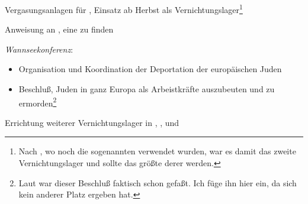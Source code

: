 \begin{chronik}
\item[Juni 1941]
Vergasungsanlagen für , Einsatz ab Herbst als
Vernichtungslager\footnote{Nach , wo noch die sogenannten
 verwendet wurden\cite{WikChelmno}, war es damit das
zweite Vernichtungslager und sollte das größte derer werden.}

\item[31.\,7.\,1941] Anweisung an , eine  zu finden

\item[20.\,1.\,1942]
\emph{Wannseekonferenz}:
\begin{itemize}
\item Organisation und Koordination der Deportation der europäischen
Juden
\item Beschluß, Juden in ganz Europa als Arbeistkräfte auszubeuten und
zu ermorden\footnote{Laut \cite{WikWannsee} war dieser Beschluß
faktisch schon gefaßt. Ich füge ihn hier ein, da sich kein anderer
Platz ergeben hat.}
\end{itemize}

\item[1942]
Errichtung weiterer Vernichtungslager in , ,
 und 
\end{chronik}

\endinput
